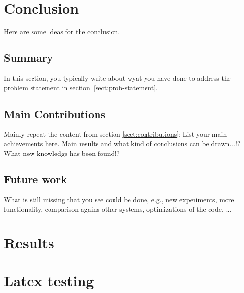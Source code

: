\chapter{Conclusion}\label{chap:concl}

Here are some ideas for the conclusion.

\section{Summary}

In this section, you typically write about wyat you have done to
address the problem statement in section~\ref{sect:prob-statement}.


\section{Main Contributions}

Mainly repeat the content from section \ref{sect:contributions}:
List your main achievements here. Main results and what kind of
conclusions can be drawn...!? What new knowledge has been found!?
 
\section{Future work}

What is still missing that you see could be done, e.g., new
experiments, more functionality, comparison agains other systems,
optimizations of the code, ...


\chapter{Results}                     %


\chapter{Latex testing} 

